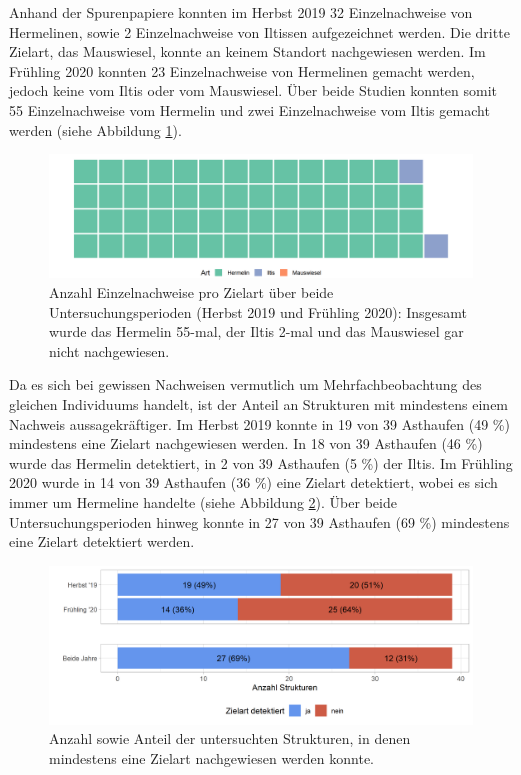 \documentclass[
  oneside]{scrbook}
\begin{document}
Anhand der Spurenpapiere konnten im Herbst 2019 32 Einzelnachweise von Hermelinen, sowie 2 Einzelnachweise von Iltissen aufgezeichnet werden. Die dritte Zielart, das Mauswiesel, konnte an keinem Standort nachgewiesen werden. Im Frühling 2020 konnten 23 Einzelnachweise von Hermelinen gemacht werden, jedoch keine vom Iltis oder vom Mauswiesel. Über beide Studien konnten somit 55 Einzelnachweise vom Hermelin und zwei Einzelnachweise vom Iltis gemacht werden (siehe Abbildung \ref{fig:wirkungskontrollesystematischeinzelnachweisewaffle}).



\begin{figure}
\includegraphics[width=1\linewidth]{images/wirkungskontrolle_systematisch_einzelnachweise_waffle} \caption{Anzahl Einzelnachweise pro Zielart über beide Untersuchungsperioden (Herbst 2019 und Frühling 2020): Insgesamt wurde das Hermelin 55-mal, der Iltis 2-mal und das Mauswiesel gar nicht nachgewiesen.}\label{fig:wirkungskontrollesystematischeinzelnachweisewaffle}
\end{figure}

Da es sich bei gewissen Nachweisen vermutlich um Mehrfachbeobachtung des gleichen Individuums handelt, ist der Anteil an Strukturen mit mindestens einem Nachweis aussagekräftiger. Im Herbst 2019 konnte in 19 von 39 Asthaufen (49 \%) mindestens eine Zielart nachgewiesen werden. In 18 von 39 Asthaufen (46 \%) wurde das Hermelin detektiert, in 2 von 39 Asthaufen (5 \%) der Iltis. Im Frühling 2020 wurde in 14 von 39 Asthaufen (36 \%) eine Zielart detektiert, wobei es sich immer um Hermeline handelte (siehe Abbildung \ref{fig:strukturenmitzielart}). Über beide Untersuchungsperioden hinweg konnte in 27 von 39 Asthaufen (69 \%) mindestens eine Zielart detektiert werden.



\begin{figure}
\includegraphics[width=1\linewidth]{images/strukturen_mit_zielart} \caption{Anzahl sowie Anteil der untersuchten Strukturen, in denen mindestens eine Zielart nachgewiesen werden konnte.}\label{fig:strukturenmitzielart}
\end{figure}
\end{document}
